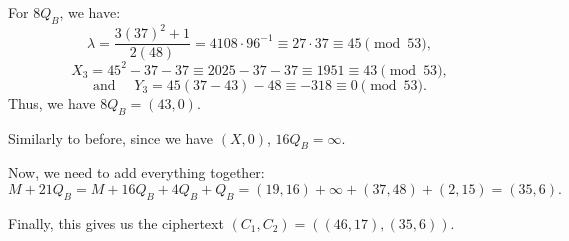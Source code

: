 \documentclass[11pt]{article}
\begin{document}
\begin{enumerate}
\begin{enumerate}
{\begin{enumerate}[label=(\roman*)]
                For \(8Q_{B}\), we have:
                \[
                    \lambda = \frac{3(37)^{2} + 1}{2(48)} = 4108 \cdot 96^{-1} \equiv 27 \cdot 37 \equiv 45 \pmod{53},
                \]
                \[
                    X_{3} = 45^{2} - 37 - 37 \equiv 2025 - 37 - 37 \equiv 1951 \equiv 43 \pmod{53},
                \]
                \[
                    \text{and }\quad Y_{3} = 45(37 - 43) - 48 \equiv -318 \equiv 0 \pmod{53}.
                \]
                Thus, we have \(8Q_{B} = (43,0)\).

                Similarly to before, since we have \((X,0)\), \(16Q_{B} = \infty\). 

                Now, we need to add everything together:
                \[
                    M + 21Q_{B} = M + 16Q_{B} + 4Q_{B} + Q_{B} = (19,16) + \infty + (37,48) + (2,15) = (35,6).
                \]

                Finally, this gives us the ciphertext \((C_{1},C_{2}) = ((46,17),(35,6))\).
            \end{enumerate}
        }


    \end{enumerate}
\end{enumerate}
\end{document}
